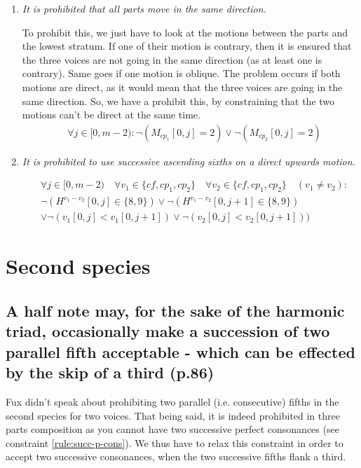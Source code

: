 \begin{enumerate}[wide, label=\bfseries 1.P\arabic*]
    \item\label{constraint:same-movement} \reddot \textit{It is prohibited that all parts move in the same direction.}

    To prohibit this, we just have to look at the motions between the parts and the lowest stratum. If one of their motion is contrary, then it is ensured that the three voices are not going in the same direction (as at least one is contrary). Same goes if one motion is oblique. The problem occurs if both motions are direct, as it would mean that the three voices are going in the same direction. So, we have a prohibit this, by constraining that the two motions can't be direct at the same time. 
    \begin{equation} \begin{aligned}
    &\forall j \in [0, m-2) \colon \neg (M_{cp_1}[0, j] = 2) \lor \neg (M_{cp_2}[0, j] = 2)
    \end{aligned} \end{equation}

    \item\label{constraint:ascending-sixths} \reddot \textit{It is prohibited to use successive ascending sixths on a direct upwards motion.}

    \begin{equation} \begin{aligned}
    &\forall j \in [0, m-2)   \quad \forall v_1 \in \{cf, cp_1, cp_2\} \quad \forall v_2 \in \{cf, cp_1, cp_2\} \quad (v_1 \neq v_2) \colon\\
    &\neg (H^{v_1-v_2}[0, j] \in \{8, 9\} ) \lor \neg (H^{v_1-v_2}[0, j+1] \in \{8, 9\})\\
    &\lor \neg (v_1[0,j] < v_1[0,j+1]) \lor \neg (v_2[0,j] < v_2[0,j+1]))
    \end{aligned} \end{equation}
\end{enumerate}


\section{Second species}
\subsection{A half note may, for the sake of the harmonic triad, occasionally make a succession of two parallel fifth acceptable - which can be effected by the skip of a third (p.86)}
Fux didn't speak about prohibiting two parallel (i.e. consecutive) fifths in the second species for two voices. That being said, it is indeed prohibited in three parts composition as you cannot have two successive perfect consonances (see constraint \ref{rule:succ-p-cons}). We thus have to relax this constraint in order to accept two successive consonances, when the two successive fifths flank a third.


